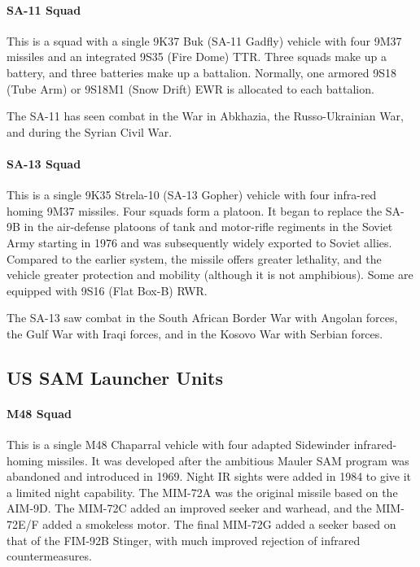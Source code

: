 \paragraph{SA-11 Squad}

This is a squad with a single 9K37 Buk (SA-11 Gadfly) vehicle with four 9M37 missiles and an integrated 9S35 (Fire Dome) TTR. Three squads make up a battery, and three batteries make up a battalion. Normally, one armored 9S18 (Tube Arm) or 9S18M1 (Snow Drift) EWR is allocated to each battalion.

The SA-11 has seen combat in the War in Abkhazia, the Russo-Ukrainian War, and during the Syrian Civil War.

\paragraph{SA-13 Squad}

This is a single 9K35 Strela-10 (SA-13 Gopher) vehicle with four infra-red homing 9M37 missiles. Four squads form a platoon.
It began to replace the SA-9B in the air-defense platoons of tank and motor-rifle regiments in the Soviet Army starting in 1976 and was subsequently widely exported to Soviet allies.
Compared to the earlier system, the missile offers greater lethality, and the vehicle greater protection and mobility (although it is not amphibious).
Some are equipped with 9S16 (Flat Box-B) RWR.

The SA-13 saw combat in the South African Border War with Angolan forces, the Gulf War with Iraqi forces, and in the Kosovo War with Serbian forces.

\subsection{US SAM Launcher Units}

\paragraph{M48 Squad}

This is a single M48 Chaparral vehicle with four adapted Sidewinder infrared-homing missiles. It was developed after the ambitious Mauler SAM program was abandoned and introduced in 1969. Night IR sights were added in 1984 to give it a limited night capability. The MIM-72A was the original missile based on the AIM-9D. The MIM-72C added an improved seeker and warhead, and the MIM-72E/F added a smokeless motor. The final MIM-72G added a seeker based on that of the FIM-92B Stinger, with much improved rejection of infrared countermeasures.

